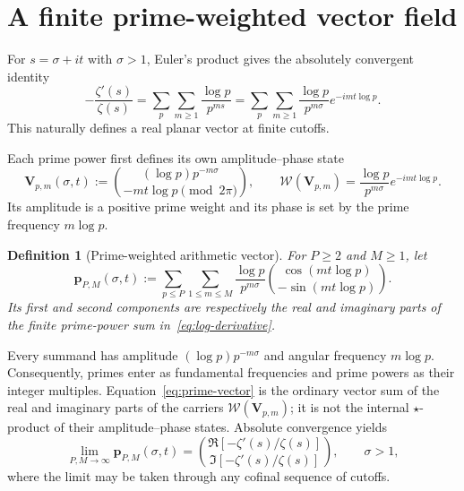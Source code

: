 \documentclass[11pt]{article}
\newtheorem{definition}{Definition}[section]
\begin{document}
\section{A finite prime-weighted vector field}
For $s=\sigma+it$ with $\sigma>1$, Euler's product gives the absolutely convergent
identity \cite{Titchmarsh}
\begin{equation}\label{eq:log-derivative}
 -\frac{\zeta'(s)}{\zeta(s)}
 =\sum_{p}\sum_{m\ge1}\frac{\log p}{p^{ms}}
 =\sum_p\sum_{m\ge1}\frac{\log p}{p^{m\sigma}}
   e^{-im t\log p}.
\end{equation}
This naturally defines a real planar vector at finite cutoffs.

Each prime power first defines its own amplitude--phase state
\begin{equation}\label{eq:prime-mode-state}
 \mathbf V_{p,m}(\sigma,t)
 :=\binom{(\log p)p^{-m\sigma}}{-mt\log p\pmod{2\pi}},
 \qquad
 \mathcal W(\mathbf V_{p,m})
 =\frac{\log p}{p^{m\sigma}}e^{-imt\log p}.
\end{equation}
Its amplitude is a positive prime weight and its phase is set by the prime frequency
$m\log p$.

\begin{definition}[Prime-weighted arithmetic vector]\label{def:prime-vector}
For $P\ge2$ and $M\ge1$, let
\begin{equation}\label{eq:prime-vector}
 \boxed{
 \mathbf p_{P,M}(\sigma,t)
 :=\sum_{p\le P}\sum_{1\le m\le M}
 \frac{\log p}{p^{m\sigma}}
 \binom{\cos(mt\log p)}{-\sin(mt\log p)}.}
\end{equation}
Its first and second components are respectively the real and imaginary parts of the finite
prime-power sum in~\eqref{eq:log-derivative}.
\end{definition}

Every summand has amplitude $(\log p)p^{-m\sigma}$ and angular frequency $m\log p$.
Consequently, primes enter as fundamental frequencies and prime powers as their integer
multiples.  Equation~\eqref{eq:prime-vector} is the ordinary vector sum of the real and
imaginary parts of the carriers $\mathcal W(\mathbf V_{p,m})$; it is not the internal
$\star$-product of their amplitude--phase states.  Absolute convergence yields
\begin{equation}\label{eq:prime-vector-limit}
 \lim_{P,M\to\infty}\mathbf p_{P,M}(\sigma,t)
 =\binom{\Re[-\zeta'(s)/\zeta(s)]}{\Im[-\zeta'(s)/\zeta(s)]},
 \qquad \sigma>1,
\end{equation}
where the limit may be taken through any cofinal sequence of cutoffs.
\end{document}
